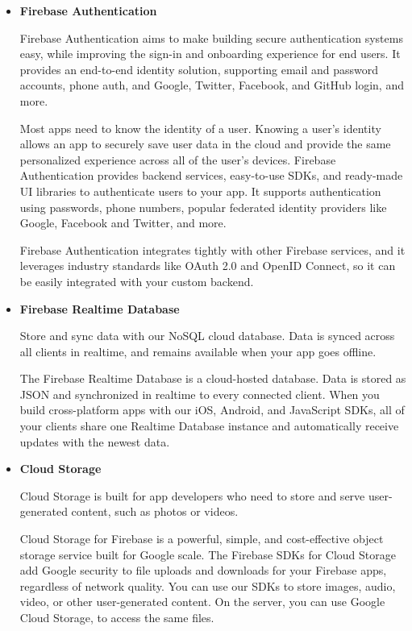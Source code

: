 \begin{itemize}
\begin{itemize}

\item \textbf{Firebase Authentication}

Firebase Authentication aims to make building secure authentication systems easy, while improving the sign-in and onboarding experience for end users. It provides an end-to-end identity solution, supporting email and password accounts, phone auth, and Google, Twitter, Facebook, and GitHub login, and more.

Most apps need to know the identity of a user. Knowing a user's identity allows an app to securely save user data in the cloud and provide the same personalized experience across all of the user's devices.
Firebase Authentication provides backend services, easy-to-use SDKs, and ready-made UI libraries to authenticate users to your app. It supports authentication using passwords, phone numbers, popular federated identity providers like Google, Facebook and Twitter, and more.

Firebase Authentication integrates tightly with other Firebase services, and it leverages industry standards like OAuth 2.0 and OpenID Connect, so it can be easily integrated with your custom backend.

\item \textbf{Firebase Realtime Database}

Store and sync data with our NoSQL cloud database. Data is synced across all clients in realtime, and remains available when your app goes offline.

The Firebase Realtime Database is a cloud-hosted database. Data is stored as JSON and synchronized in realtime to every connected client. When you build cross-platform apps with our iOS, Android, and JavaScript SDKs, all of your clients share one Realtime Database instance and automatically receive updates with the newest data.


\item \textbf{Cloud Storage}

Cloud Storage is built for app developers who need to store and serve user-generated content, such as photos or videos.

Cloud Storage for Firebase is a powerful, simple, and cost-effective object storage service built for Google scale. The Firebase SDKs for Cloud Storage add Google security to file uploads and downloads for your Firebase apps, regardless of network quality. You can use our SDKs to store images, audio, video, or other user-generated content. On the server, you can use Google Cloud Storage, to access the same files.
	\end{itemize}
	\end{itemize}
	

